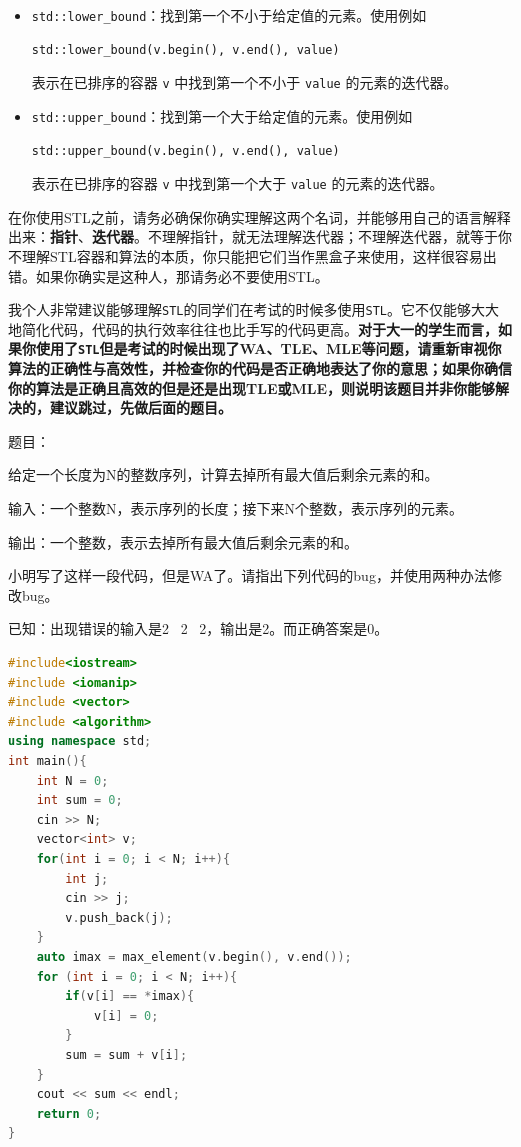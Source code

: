 \documentclass{article}
\begin{document}
\begin{itemize}
  \item \texttt{std::lower\_bound}：找到第一个不小于给定值的元素。使用例如
    \begin{lstlisting}
std::lower_bound(v.begin(), v.end(), value)
    \end{lstlisting}
    表示在已排序的容器 \texttt{v} 中找到第一个不小于 \texttt{value} 的元素的迭代器。

  \item \texttt{std::upper\_bound}：找到第一个大于给定值的元素。使用例如
    \begin{lstlisting}
std::upper_bound(v.begin(), v.end(), value)
    \end{lstlisting}
    表示在已排序的容器 \texttt{v} 中找到第一个大于 \texttt{value} 的元素的迭代器。
\end{itemize}

{\color{red}在你使用STL之前，请务必确保你确实理解这两个名词，并能够用自己的语言解释出来：\textbf{指针}、\textbf{迭代器}。不理解指针，就无法理解迭代器；不理解迭代器，就等于你不理解STL容器和算法的本质，你只能把它们当作黑盒子来使用，这样很容易出错。如果你确实是这种人，那请务必不要使用STL。}

我个人非常建议能够理解\texttt{STL}的同学们在考试的时候多使用\texttt{STL}。它不仅能够大大地简化代码，代码的执行效率往往也比手写的代码更高。\textbf{对于大一的学生而言，如果你使用了\texttt{STL}但是考试的时候出现了WA、TLE、MLE等问题，请重新审视你算法的正确性与高效性，并检查你的代码是否正确地表达了你的意思；如果你确信你的算法是正确且高效的但是还是出现TLE或MLE，则说明该题目并非你能够解决的，建议跳过，先做后面的题目。}

\begin{example}
  题目：

  给定一个长度为N的整数序列，计算去掉所有最大值后剩余元素的和。

  输入：一个整数N，表示序列的长度；接下来N个整数，表示序列的元素。

  输出：一个整数，表示去掉所有最大值后剩余元素的和。

  小明写了这样一段代码，但是WA了。请指出下列代码的bug，并使用两种办法修改bug。

  已知：出现错误的输入是2 \ 2 \ 2，输出是2。而正确答案是0。
\begin{lstlisting}[language=C++]
#include<iostream>
#include <iomanip>
#include <vector>
#include <algorithm>
using namespace std;
int main(){
    int N = 0;
    int sum = 0;
    cin >> N;
    vector<int> v;
    for(int i = 0; i < N; i++){
        int j;
        cin >> j;
        v.push_back(j);
    }
    auto imax = max_element(v.begin(), v.end());
    for (int i = 0; i < N; i++){
        if(v[i] == *imax){
            v[i] = 0;
        }
        sum = sum + v[i];
    }
    cout << sum << endl;
    return 0;
}
\end{lstlisting}
\end{example}
\end{document}
